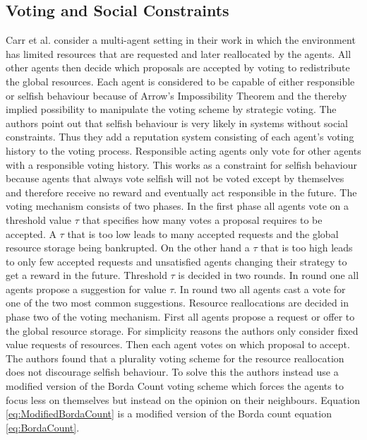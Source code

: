 \documentclass[conference]{IEEEtran}
\begin{document}
\subsection{Voting and Social Constraints}
Carr et al. consider a multi-agent setting in their work \cite{carr2008peer} in which the environment has limited resources that are requested and later reallocated by the agents. All other agents then decide which proposals are accepted by voting to redistribute the global resources.
\newline
Each agent is considered to be capable of either responsible or selfish behaviour because of Arrow's Impossibility Theorem and the thereby implied possibility to manipulate the voting scheme by strategic voting. The authors point out that selfish behaviour is very likely in systems without social constraints.
Thus they add a reputation system consisting of each agent's voting history to the voting process. Responsible acting agents only vote for other agents with a responsible voting history. This works as a constraint for selfish behaviour because agents that always vote selfish will not be voted except by themselves and therefore receive no reward and eventually act responsible in the future.
\newline
The voting mechanism consists of two phases. In the first phase all agents vote on a threshold value $\tau$ that specifies how many votes a proposal requires to be accepted. A $\tau$ that is too low leads to many accepted requests and the global resource storage being bankrupted. On the other hand a $\tau$ that is too high leads to only few accepted requests and unsatisfied agents changing their strategy to get a reward in the future.
Threshold $\tau$ is decided in two rounds. In round one all agents propose a suggestion for value $\tau$. In round two all agents cast a vote for one of the two most common suggestions.
Resource reallocations are decided in phase two of the voting mechanism. First all agents propose a request or offer to the global resource storage. For simplicity reasons the authors only consider fixed value requests of resources. Then each agent votes on which proposal to accept. The authors found that a plurality voting scheme for the resource reallocation does not discourage selfish behaviour. To solve this the authors instead use a modified version of the Borda Count voting scheme which forces the agents to focus less on themselves but instead on the opinion on their neighbours. Equation \eqref{eq:ModifiedBordaCount} is a modified version of the Borda count equation \eqref{eq:BordaCount}.
\end{document}

